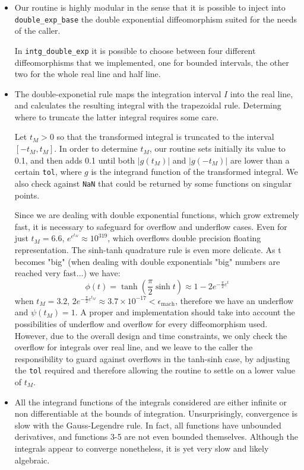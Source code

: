 \documentclass[a4paper,11]{article}
\newcommand{\mdcode}[1]{\lstinline[backgroundcolor=\color{gray!10}, frame=single, frameround=tttt]|#1|}
\begin{document}
\begin{itemize}
	\item{
		Our routine is highly modular in the sense that it is possible
		to inject into \mdcode{double_exp_base} the double
		exponential diffeomorphism suited for the needs of the caller.
		
		In \mdcode{intg_double_exp} it is possible to choose between 
		four different diffeomorphisms that we implemented, one for 
		bounded intervals, the other two for the whole real line and half line.
	}
	\item{
		The double-exponetial rule maps the integration interval $I$ into the
		real line, and calculates the resulting integral with the trapezoidal 
		rule. Determing where to truncate the latter integral requires some care.
		
		Let $t_{M}>0$ so that the transformed integral is truncated to the
		interval $[-t_{M}, t_{M}]$. In order to determine $t_{M}$, our routine
		sets initially its value to 0.1, and then adds 0.1 until both $|g(t_{M})|$ 
		and $|g(-t_{M})|$ are lower than a certain \mdcode{tol}, where $g$
		is the integrand function of the transformed integral. We also check
		against \mdcode{NaN} that could be returned by some functions on 
		singular points.
		
		Since we are dealing with double exponential functions, which grow
		extremely fast, it is necessary to safeguard for overflow and underflow
		cases. Even for just $t_{M}=6.6$, $e^{e^{t_{M}}}\approx 10^{319}$, which
		overflows double precision floating representation. The sinh-tanh 
		quadrature rule is even more delicate. As t becomes "big" (when dealing
		with double exponentials "big" numbers are reached very fast...) we 
		have:
		\[
			\phi(t) = \tanh \left(\frac{\pi}{2}\sinh t \right) 
			\approx 1 - 2 e^{-\frac{\pi}{2}e^{t}}
		\]
		when $t_{M} = 3.2$, $2 e^{-\frac{\pi}{2}e^{t_{M}}} \approx 3.7 \times 
		10^{-17} < \epsilon_{\text{mach}}$, therefore we have an underflow and
		$\psi(t_{M}) = 1$. A proper and implementation should take into account 
		the possibilities of underflow and overflow for every diffeomorphism 
		used. However, due to the overall design and time constraints, we only
		check the overflow for integrals over real line, and we leave to the
		caller the responsibility to guard against overflows in the 
		tanh-sinh case, by adjusting the \mdcode{tol} required and therefore
		allowing the routine to settle on a lower value of $t_{M}$.
	}
	\item{
		All the integrand functions of the integrals considered are either 
		infinite or non differentiable at the bounds of integration.
		Unsurprisingly, convergence is slow with the Gauss-Legendre rule.
		In fact, all functions have unbounded derivatives, and 
		functions 3-5 are not even bounded themselves. Although the integrals
		appear to converge nonetheless, it is yet very slow and likely 
		algebraic.
		
}
\end{itemize}
\end{document}
